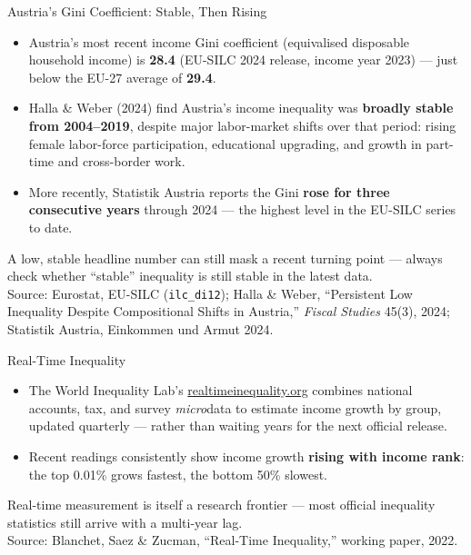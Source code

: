 \documentclass[11pt,aspectratio=169]{beamer}
\newcommand{\srcnote}[1]{{\footnotesize\color{wugray}Source: #1}}
\begin{document}
\begin{frame}{Austria's Gini Coefficient: Stable, Then Rising}
  \small
  \begin{itemize}
    \item Austria's most recent income Gini coefficient (equivalised disposable household income) is \textbf{28.4} (EU-SILC 2024 release, income year 2023) --- just below the EU-27 average of \textbf{29.4}.
    \item Halla \& Weber (2024) find Austria's income inequality was \textbf{broadly stable from 2004--2019}, despite major labor-market shifts over that period: rising female labor-force participation, educational upgrading, and growth in part-time and cross-border work.
    \item More recently, Statistik Austria reports the Gini \textbf{rose for three consecutive years} through 2024 --- the highest level in the EU-SILC series to date.
  \end{itemize}
  \vspace{0.3em}
  \centering
  A low, stable headline number can still mask a recent turning point --- always check whether ``stable'' inequality is still stable in the latest data.\\
  \srcnote{Eurostat, EU-SILC (\texttt{ilc\_di12}); Halla \& Weber, ``Persistent Low Inequality Despite Compositional Shifts in Austria,'' \emph{Fiscal Studies} 45(3), 2024; Statistik Austria, Einkommen und Armut 2024.}
\end{frame}

\begin{frame}{Real-Time Inequality}
  \small
  \begin{itemize}
    \item The World Inequality Lab's \href{https://realtimeinequality.org}{realtimeinequality.org} combines national accounts, tax, and survey \emph{micro}data to estimate income growth by group, updated quarterly --- rather than waiting years for the next official release.
    \item Recent readings consistently show income growth \textbf{rising with income rank}: the top 0.01\% grows fastest, the bottom 50\% slowest.
  \end{itemize}
  \vspace{0.3em}
  \centering
  \alert{Real-time measurement is itself a research frontier --- most official inequality statistics still arrive with a multi-year lag.}\\
  \srcnote{Blanchet, Saez \& Zucman, ``Real-Time Inequality,'' working paper, 2022.}
\end{frame}
\end{document}
